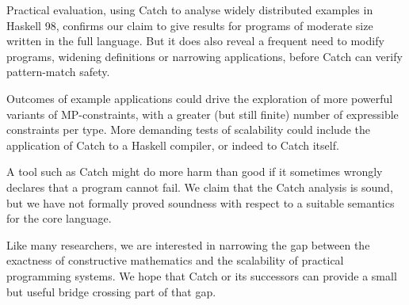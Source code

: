 \documentclass[preprint]{sigplanconf}
\begin{document}
Practical evaluation, using Catch to analyse widely distributed examples
in Haskell 98, confirms our claim to give results for programs of moderate
size written in the full language. But it does also reveal a frequent need
to modify programs, widening definitions or narrowing applications,
before Catch can verify pattern-match safety.

Outcomes of example applications could drive the exploration of more
powerful variants of MP-constraints, with a greater (but still finite)
number of expressible constraints per type.  More demanding tests of
scalability could include the application of Catch to a Haskell compiler,
or indeed to Catch itself.

A tool such as Catch might do more harm than good if it sometimes wrongly
declares that a program cannot fail.  We claim that the Catch analysis
is sound, but we have not formally proved soundness with respect to a
suitable semantics for the core language.

Like many researchers, we are interested in narrowing the gap between the
exactness of constructive mathematics and the scalability of practical
programming systems.  We hope that Catch or its successors can provide
a small but useful bridge crossing part of that gap.



\end{document}
